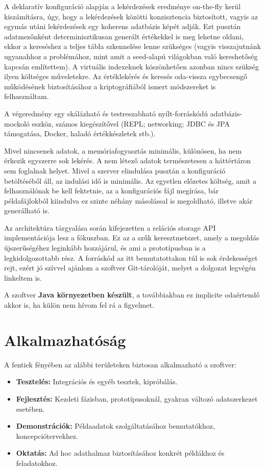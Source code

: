\documentclass[
    parspace,
    noindent,
    nohyp,
]{elteiktdk}[2023/04/10]
\begin{document}
A deklaratív konfiguráció alapján a lekérdezések eredménye on-the-fly kerül kiszámításra,
úgy, hogy a lekérdezések közötti konzisztencia biztosított,
vagyis az egymás utáni lekérdezések egy koherens adatbázis képét adják.
Ezt pusztán adatmezőnként determinisztikusan generált értékekkel is meg lehetne oldani,
ekkor a kereséshez a teljes tábla szkennelése lenne szükséges
(vagyis visszajutnánk ugyanahhoz a problémához,
mint amit a seed-alapú világokban való kereshetőség kapcsán említettem).
A virtuális indexeknek köszönhetően azonban nincs szükség ilyen költséges műveletekre.
Az értéklekérés és keresés oda-vissza egybecsengő működésének
biztosításához a kriptográfiából ismert módszereket is felhasználtam.

A végeredmény egy skálázható és testreszabható nyílt-forráskódú adatbázis-mockoló eszköz,
számos kiegészítővel
(REPL; networking; JDBC és JPA támogatása, Docker, haladó értékkészletek stb.).

Mivel nincsenek adatok, a memóriafogyasztás minimális,
különösen, ha nem érkezik egyszerre sok lekérés.
A nem létező adatok természetesen a háttértáron sem foglalnak helyet.
Mivel a szerver elindulása pusztán a konfiguráció betöltéséből áll,
az indulási idő is minimális.
Az egyetlen előzetes költség, amit a felhasználónak be kell fektetnie,
az a konfigurációs fájl megírása,
bár példafájlokból kiindulva ez szinte néhány másolással is megoldható,
illetve akár generálható is.

Az architektúra tárgyalása során kifejezetten a relációs storage API implementációja lesz a fókuszban.
Ez az a szűk keresztmetszet, amely a megoldás újszerűségéhez leginkább hozzájárul,
és ami a prototípusban is a legkidolgozottabb rész.
A forráskód az itt bemutatottakon túl is sok érdekességet rejt,
ezért jó szívvel ajánlom a szoftver Git-tárolóját,
melyet a dolgozat legvégén linkeltem is.

A szoftver \textbf{Java környezetben készült},
a továbbiakban ez implicite odaértendő akkor is,
ha külön nem hívom fel rá a figyelmet.

\section{Alkalmazhatóság}

A fentiek fényében az alábbi területeken biztosan alkalmazható a szoftver:

\begin{itemize}
    \setlength\itemsep{-0.4em}
    \item \textbf{Tesztelés:} Integrációs és egyéb tesztek, kipróbálás.
    \item \textbf{Fejlesztés:} Kezdeti fázisban, prototípusoknál, gyakran változó adatszerkezet esetében.
    \item \textbf{Demonstrációk:} Példaadatok szolgáltatásához bemutatókhoz, koncepciótervekhez.
    \item \textbf{Oktatás:} Ad hoc adathalmaz biztosításához konkrét példákhoz és feladatokhoz.
\end{itemize}
\end{document}
